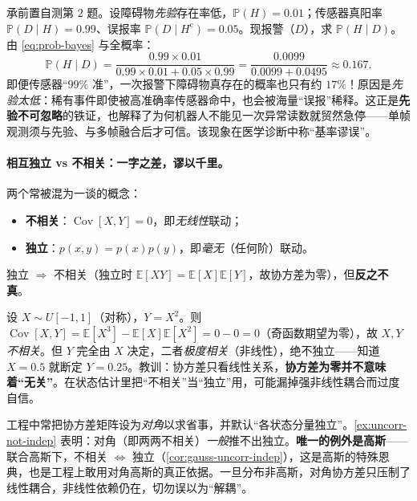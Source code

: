 \begin{example}\label{ex:bayes-alarm}
承前置自测第 $2$ 题。设障碍物\emph{先验}存在率低，$\mathbb{P}(H)=0.01$；传感器真阳率 $\mathbb{P}(D\mid H)=0.99$、误报率 $\mathbb{P}(D\mid H^{\mathrm c})=0.05$。现报警（$D$），求 $\mathbb{P}(H\mid D)$。由 \cref{eq:prob-bayes} 与全概率：
\[
  \mathbb{P}(H\mid D)=\frac{0.99\times0.01}{0.99\times0.01+0.05\times0.99}
  =\frac{0.0099}{0.0099+0.0495}\approx0.167.
\]
即便传感器“$99\%$ 准”，一次报警下障碍物真存在的概率也只有约 $17\%$！原因是\emph{先验太低}：稀有事件即使被高准确率传感器命中，也会被海量“误报”稀释。这正是\textbf{先验不可忽略}的铁证，也解释了为何机器人不能见一次异常读数就贸然急停——单帧观测须与先验、与多帧融合后才可信。该现象在医学诊断中称“基率谬误”。
\end{example}

\paragraph{相互独立 vs 不相关：一字之差，谬以千里。}
两个常被混为一谈的概念：
\begin{itemize}
  \item \textbf{不相关}：$\operatorname{Cov}[X,Y]=0$，即\emph{无线性}联动；
  \item \textbf{独立}：$p(x,y)=p(x)p(y)$，即\emph{毫无}（任何阶）联动。
\end{itemize}
独立 $\Rightarrow$ 不相关（独立时 $\mathbb{E}[XY]=\mathbb{E}[X]\mathbb{E}[Y]$，故协方差为零），但\textbf{反之不真}。

\begin{example}[不相关却不独立的经典反例]\label{ex:uncorr-not-indep}
设 $X\sim U[-1,1]$（对称），$Y=X^2$。则 $\operatorname{Cov}[X,Y]=\mathbb{E}[X^3]-\mathbb{E}[X]\mathbb{E}[X^2]=0-0=0$（奇函数期望为零），故 $X,Y$ \emph{不相关}。但 $Y$ 完全由 $X$ 决定，二者\emph{极度相关}（非线性），绝不独立——知道 $X=0.5$ 就断定 $Y=0.25$。教训：协方差只看线性关系，\textbf{协方差为零并不意味着“无关”}。在状态估计里把“不相关”当“独立”用，可能漏掉强非线性耦合而过度自信。
\end{example}

\begin{pitfall}
工程中常把协方差矩阵设为\emph{对角}以求省事，并默认“各状态分量独立”。\cref{ex:uncorr-not-indep} 表明：对角（即两两不相关）\emph{一般}推不出独立。\textbf{唯一的例外是高斯}——联合高斯下，不相关 $\Longleftrightarrow$ 独立（\cref{cor:gauss-uncorr-indep}），这是高斯的特殊恩典，也是工程上敢用对角高斯的真正依据。一旦分布非高斯，对角协方差只压制了线性耦合，非线性依赖仍在，切勿误以为“解耦”。
\end{pitfall}


